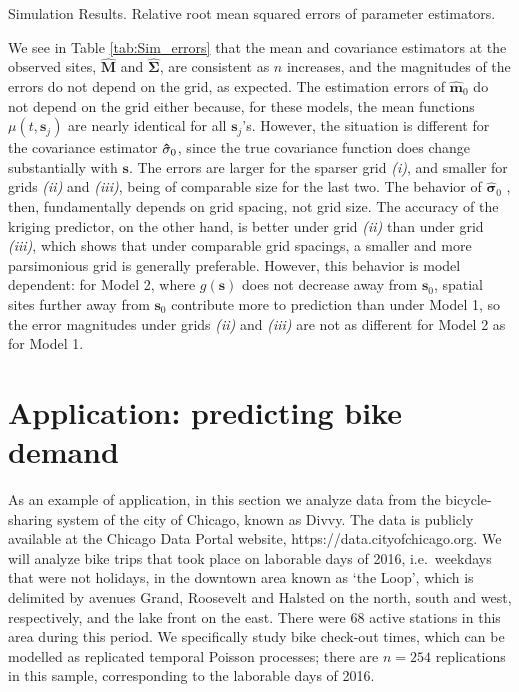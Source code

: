 \documentclass[titlepage,12pt]{article}
\begin{document}
\begin{table}[tbp]
\caption{Simulation Results. Relative root mean squared errors of parameter
estimators.}\label{tab:Sim_errors}%
\end{table}%

We see in Table \ref{tab:Sim_errors} that the mean and covariance estimators
at the observed sites, $\mathbf{\hat{M}}$ and $\mathbf{\hat{\Sigma}}$, are
consistent as $n$ increases, and the magnitudes of the errors do not depend
on the grid, as expected. The estimation errors of $\mathbf{\hat{m}}_{0}$ do
not depend on the grid either because, for these models, the mean functions $%
\mu (t,\mathbf{s}_{j})$ are nearly identical for all $\mathbf{s}_{j}$'s.
However, the situation is different for the covariance estimator $\mathbf{%
\hat{\sigma}}_{0}$, since the true covariance function does change
substantially with $\mathbf{s}$. The errors are larger for the sparser grid 
\emph{(i)}, and smaller for grids \emph{(ii)} and \emph{(iii)}, being of
comparable size for the last two. The behavior of $\mathbf{\hat{\sigma}}_{0}$%
, then, fundamentally depends on grid spacing, not grid size. The accuracy
of the kriging predictor, on the other hand, is better under grid \emph{(ii)}
than under grid \emph{(iii)}, which shows that under comparable grid
spacings, a smaller and more parsimonious grid is generally preferable.
However, this behavior is model dependent: for Model 2, where $g(\mathbf{s})$
does not decrease away from $\mathbf{s}_{0}$, spatial sites further away
from $\mathbf{s}_{0}$ contribute more to prediction than under Model 1, so
the error magnitudes under grids \emph{(ii)} and \emph{(iii)} are not as
different for Model 2 as for Model 1.

\section{Application: predicting bike demand\label{sec:Example}}

As an example of application, in this section we analyze data from the
bicycle-sharing system of the city of Chicago, known as Divvy. The data is
publicly available at the Chicago Data Portal website,
https://data.cityofchicago.org. We will analyze bike trips that took place
on laborable days of 2016, i.e.~weekdays that were not holidays, in the
downtown area known as `the Loop', which is delimited by avenues Grand,
Roosevelt and Halsted on the north, south and west, respectively, and the
lake front on the east. There were 68 active stations in this area during
this period. We specifically study bike check-out times, which can be
modelled as replicated temporal Poisson processes; there are $n=254$
replications in this sample, corresponding to the laborable days of 2016.
\end{document}
